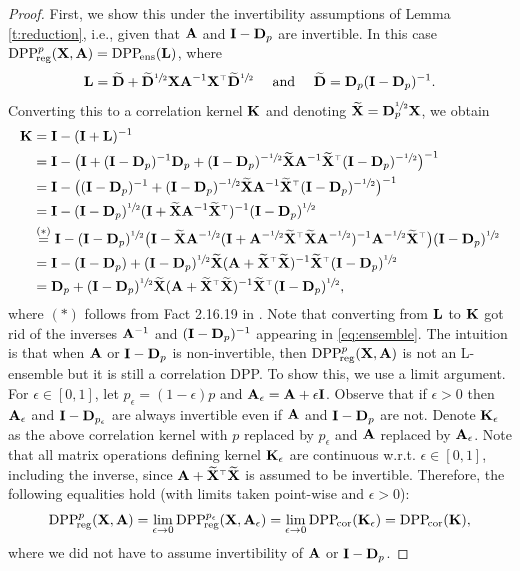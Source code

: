 \documentclass[thesis.tex]{subfiles}
\begin{document}
  \begin{proof}
    First, we show this under the invertibility assumptions of Lemma
    \ref{t:reduction}, i.e., given that $\mathbf A$ and $\mathbf I-\mathbf D_p$ are
    invertible. In this case ${{\mathrm{DPP}}_{\!\mathrm{reg}}^{p}}(\mathbf X,\mathbf A)={{\mathrm{DPP}}_{\!\mathrm{ens}}}(\mathbf{L})$, where
    \begin{align}\L=\Dbt+
    \Dbt^{\sfrac12}\X\A^{-1}\X^\top
      \Dbt^{\sfrac12}\quad\text{ and }\quad\Dbt=\D_p(\I-\D_p)^{-1}.\label{eq:ensemble}
\end{align}
Converting this to
    a correlation kernel $\mathbf K$ and denoting $\widetilde{\mathbf{X}}=\mathbf D_p^{\sfrac12}\mathbf X$, we obtain
    \begin{align*}
      \K&=\I-(\I+\L)^{-1}
\\      &=\I - \big(\I + (\I-\D_p)^{-1}\D_p +
(\I-\D_p)^{-\sfrac12}\Xt\A^{-1}\Xt^\top(\I-\D_p)^{-\sfrac12}\big)^{-1}
\\ &= \I - \big((\I-\D_p)^{-1} +
     (\I-\D_p)^{-\sfrac12}\Xt\A^{-1}\Xt^\top(\I-\D_p)^{-\sfrac12}\big)^{-1}
\\ &=\I -
     (\I-\D_p)^{\sfrac12}(\I+\Xt\A^{-1}\Xt^\top)^{-1}(\I-\D_p)^{\sfrac12}
      \\
      &\overset{(*)}{=}\I -
     (\I-\D_p)^{\sfrac12}\big(\I-\Xt\A^{-\sfrac12}
     (\I+\A^{-\sfrac12}\Xt^\top\Xt\A^{-\sfrac12})^{-1}
     \A^{-\sfrac12}\Xt^\top\big)(\I-\D_p)^{\sfrac12}
      \\
      &=\I - (\I-\D_p) +
     (\I-\D_p)^{\sfrac12}\Xt(\A+\Xt^\top\Xt)^{-1}\Xt^\top(\I-\D_p)^{\sfrac12}
\\ &=\D_p + (\I-\D_p)^{\sfrac12}\Xt(\A+\Xt^\top\Xt)^{-1}\Xt^\top(\I-\D_p)^{\sfrac12},
    \end{align*}
    where $(*)$ follows from Fact 2.16.19 in
    \cite{matrix-mathematics}. Note that converting from $\mathbf{L}$ to $\mathbf K$
    got rid of the inverses $\mathbf A^{-1}$  and $(\mathbf I-\mathbf D_p)^{-1}$ appearing
    in \eqref{eq:ensemble}. The intuition 
    is that when $\mathbf A$ or $\mathbf I-\mathbf D_p$ is non-invertible, then
    ${{\mathrm{DPP}}_{\!\mathrm{reg}}^{p}}(\mathbf X,\mathbf A)$ is not an L-ensemble but it is still a
    correlation DPP. To show this, we use a limit argument. For
    $\epsilon\in[0,1]$, let $p_\epsilon=(1-\epsilon)p$ and
    $\mathbf A_\epsilon=\mathbf A+\epsilon\mathbf I$. Observe that if $\epsilon>0$ then $\mathbf A_\epsilon$ and
    $\mathbf I-\mathbf D_{p_{\epsilon}}$ are always invertible even if $\mathbf A$ and
    $\mathbf I-\mathbf D_p$ are not. Denote $\mathbf K_\epsilon$ as the
    above correlation kernel with $p$ replaced by $p_{\epsilon}$ and
    $\mathbf A$ replaced by $\mathbf A_{\epsilon}$. Note that all matrix operations
    defining kernel $\mathbf K_\epsilon$ are continuous w.r.t. $\epsilon\in[0,1]$, including the inverse, since
    $\A+\Xt^\top\Xt$ is assumed to be invertible. Therefore, the
    following equalities hold (with limits taken point-wise and $\epsilon>0$):
    \begin{align*}
      {{\mathrm{DPP}}_{\!\mathrm{reg}}^{p}}(\mathbf X,\mathbf A) = \lim_{\epsilon\rightarrow
      0}{{\mathrm{DPP}}_{\!\mathrm{reg}}^{p_\epsilon}}(\mathbf X,\mathbf A_{\epsilon}) =
      \lim_{\epsilon\rightarrow 0}{{\mathrm{DPP}}_{\!\mathrm{cor}}}(\mathbf K_\epsilon) = {{\mathrm{DPP}}_{\!\mathrm{cor}}}(\mathbf K),
    \end{align*}
where we did not have to assume invertibility of $\mathbf A$ or $\mathbf I-\mathbf D_p$.
\end{proof}
\end{document}
